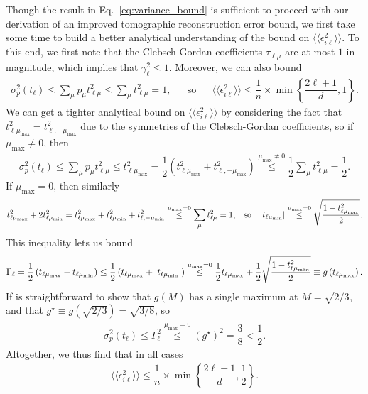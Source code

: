 \documentclass[notitlepage,twocolumn]{revtex4-2}
\renewcommand{\t}{\text} %
\newcommand{\f}[2]{\dfrac{#1}{#2}} %
\newcommand{\p}[1]{\left(#1\right)} %
\renewcommand{\Set}[1]{\left\{#1\right\}} %
\newcommand{\bbk}[1]{\langle\!\langle #1 \rangle\!\rangle}
\begin{document}
Though the result in Eq.~\eqref{eq:variance_bound} is sufficient to proceed with our derivation of an improved tomographic reconstruction error bound, we first take some time to build a better analytical understanding of the bound on $\bbk{\epsilon_{i\ell}^2}$.
To this end, we first note that the Clebsch-Gordan coefficients $\tau_{\ell\mu}$ are at most $1$ in magnitude, which implies that $\gamma_\ell^2\le 1$.
Moreover, we can also bound
\begin{align}
  \sigma_p^2\p{t_\ell} \le \sum_\mu p_\mu t_{\ell\mu}^2
  \le \sum_\mu t_{\ell\mu}^2 = 1,
  &&
  \t{so}
  &&
  \bbk{\epsilon_{i\ell}^2} \le \f1n \times \min\Set{\f{2\ell+1}{d}, 1}.
\end{align}
We can get a tighter analytical bound on $\bbk{\epsilon_{i\ell}^2}$ by considering the fact that $t_{\ell\mu_{\t{max}}}^2 = t_{\ell,-\mu_{\t{max}}}^2$ due to the symmetries of the Clebsch-Gordan coefficients, so if $\mu_{\t{max}}\ne0$, then
\begin{align}
  \sigma_p^2\p{t_\ell} \le \sum_\mu p_\mu t_{\ell\mu}^2
  \le t_{\ell\mu_{\t{max}}}^2
  = \f12 \p{t_{\ell\mu_{\t{max}}}^2 + t_{\ell,-\mu_{\t{max}}}^2}
  \stackrel{\mu_{\t{max}}\ne0}{\le} \f12 \sum_\mu t_{\ell\mu}^2
  = \f12.
\end{align}
If $\mu_{\t{max}}=0$, then similarly
\begin{align}
  t_{\ell\mu_{\t{max}}}^2 + 2 t_{\ell\mu_{\t{min}}}^2
  = t_{\ell\mu_{\t{max}}}^2 + t_{\ell\mu_{\t{min}}}^2
  + t_{\ell,-\mu_{\t{min}}}^2
  \stackrel{\mu_{\t{max}}=0}{\le}
  \sum_\mu t_{\ell\mu}^2 = 1,
  &&
  \t{so}
  &&
  \abs{t_{\ell\mu_{\t{min}}}}
  \stackrel{\mu_{\t{max}}=0}{\le}
  \sqrt{\f{1 - t_{\ell\mu_{\t{max}}}^2}{2}}.
\end{align}
This inequality lets us bound
\begin{align}
  \Gamma_\ell
  = \f12 \p{t_{\ell\mu_{\t{max}}} - t_{\ell\mu_{\t{min}}}}
  \le \f12 \p{t_{\ell\mu_{\t{max}}} + \abs{t_{\ell\mu_{\t{min}}}}}
  \stackrel{\mu_{\t{max}}=0}{\le}
  \f12 t_{\ell\mu_{\t{max}}}
  + \f12\sqrt{\f{1 - t_{\ell\mu_{\t{max}}}^2}{2}}
  \equiv g\p{t_{\ell\mu_{\t{max}}}}.
\end{align}
If is straightforward to show that $g\p{M}$ has a single maximum at $M=\sqrt{2/3}$, and that $g^\star\equiv g\p{\sqrt{2/3}}=\sqrt{3/8}$, so
\begin{align}
  \sigma_p^2\p{t_\ell} \le \Gamma_\ell^2
  \stackrel{\mu_{\t{max}}=0}{\le} \p{g^\star}^2
  = \f38 < \f12.
\end{align}
Altogether, we thus find that in all cases
\begin{align}
  \bbk{\epsilon_{i\ell}^2}
  \le \f1n \times \min\Set{\f{2\ell+1}{d}, \f12}.
\end{align}
\end{document}
